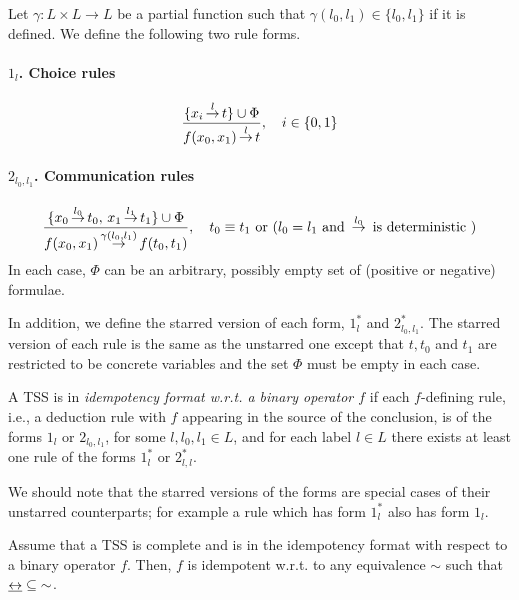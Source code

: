 \begin{definition}
\label{def::format}
Let $\gamma: L \times L \rightarrow L$ be a partial function such that $\gamma(l_0,l_1) \in \{l_0,l_1\}$ if it is defined.
We define the following two rule forms.

\paragraph{$1_l$. Choice rules}
\[
    \sosrule[i\in\{0,1\}]{\{x_i\trans{l}t\}\cup\Phi}{f(x_0,x_1)\trans{l}t} \\
\]
\paragraph{$2_{l_0,l_1}$. Communication rules}
\[
    \sosrule[t_0\equiv t_1 \mbox{ or } (l_0=l_1 \mbox{ and }  \trans{l_0}\textrm{ is deterministic } )]{\{x_0\trans{l_0}t_0,\, x_1\trans{l_1}t_1\}\cup\Phi}{f(x_0,x_1)\trans{\gamma(l_0,l_1)}f(t_0,t_1)}
\]
In each case, $\Phi$ can be an arbitrary, possibly empty set of (positive or negative) formulae.

In addition, we define the starred version of each form, $1_l^*$ and $2_{l_0,l_1}^*$. The starred version of each rule is the
same as the unstarred one except that $t, t_0$ and $t_1$ are restricted to be concrete variables and the set $\Phi$ must be
empty in each case.

A TSS is in \emph{idempotency format w.r.t. a binary operator $f$} if each \mbox{$f$-defining} rule, i.e., a deduction rule with $f$ appearing in the source of the conclusion, is of the forms $1_l$
or $2_{l_0,l_1}$, for some $l, l_0, l_1 \in L$, and for each label $l \in L$ there exists at least one rule of the forms $1_l^*$ or $2_{l,l}^*$.
\end{definition}

We should note that the starred versions of the forms are special cases of their unstarred counterparts; for example a rule
which has form $1_l^*$ also has form $1_l$.


\begin{theorem}\label{thm:idempotent}
Assume that  a TSS is complete and is in the idempotency format with respect to a binary operator $f$. Then,  $f$ is idempotent w.r.t. to
any equivalence $\sim$ such that  $\mathbin{\mbox{$\underline{\leftrightarrow}$}} \subseteq{\sim}$.
\end{theorem}



